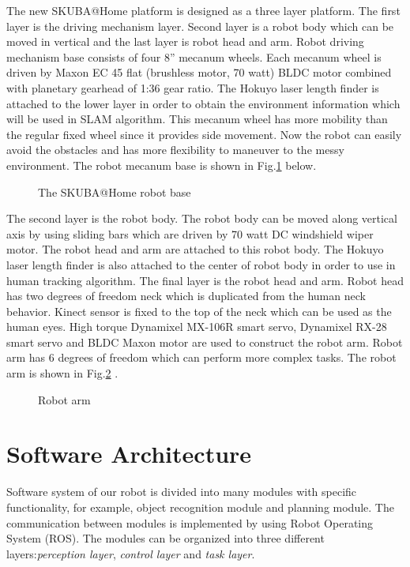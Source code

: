 \documentclass{llncs}
\begin{document}
The new SKUBA@Home platform is designed as a three layer platform. The first layer is the driving mechanism layer. Second layer is a robot body which can be moved in vertical and the last layer is robot head and arm. Robot driving mechanism base consists of four 8'' mecanum wheels. Each mecanum wheel is driven by Maxon EC 45 flat (brushless motor, 70 watt) BLDC motor combined with planetary gearhead of 1:36 gear ratio. The Hokuyo laser length finder is attached to the lower layer in
order to obtain the environment information which will be used
in SLAM algorithm. This mecanum
wheel has more mobility than the regular fixed wheel since it provides side movement. Now the robot can easily avoid the obstacles and has more flexibility to maneuver to the messy environment. The robot mecanum base is shown in Fig.\ref{fig:base} below.

\begin{figure}
\centering
\caption{The SKUBA@Home robot base}
\label{fig:base}
\end{figure}

The second layer is the robot body. The robot body can be moved along vertical axis by using sliding bars which are driven by 70 watt DC windshield wiper motor. The robot head and arm are attached to this robot body. The Hokuyo laser length finder is also attached to the center of robot body in order to use in human tracking algorithm. The final layer is the robot head and arm. Robot head has two degrees of freedom neck which is duplicated from the human neck behavior. Kinect sensor is fixed to the top of the neck which can be used as the human eyes. High torque Dynamixel MX-106R smart servo, Dynamixel RX-28 smart servo and BLDC Maxon motor are used to construct the robot arm. Robot arm has 6 degrees of freedom which can perform more complex tasks. The robot arm is shown in Fig.\ref{fig:arm} .

\begin{figure}
\centering
\caption{Robot arm}
\label{fig:arm}
\end{figure}

\section{Software Architecture}
Software system of our robot is divided into many modules with specific functionality, for example, object recognition module and planning module. The communication between modules is implemented by using Robot Operating System (ROS). The modules can be organized into three different layers:\textit{perception layer}, \textit{control layer} and \textit{task layer}.
\end{document}
